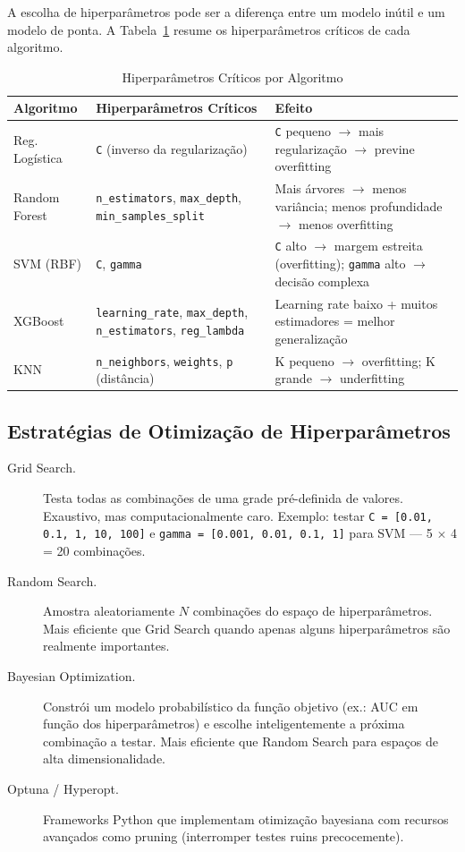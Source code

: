 A escolha de hiperparâmetros pode ser a diferença entre um modelo inútil e um modelo de ponta. A Tabela~\ref{tab:hiperparams} resume os hiperparâmetros críticos de cada algoritmo.

\begin{table}[H]
  \centering
  \caption{Hiperparâmetros Críticos por Algoritmo}
  \label{tab:hiperparams}
  \begin{tabularx}{\textwidth}{lXX}
    \toprule
    \textbf{Algoritmo} & \textbf{Hiperparâmetros Críticos} & \textbf{Efeito} \\
    \midrule
    Reg. Logística & \texttt{C} (inverso da regularização) & \texttt{C} pequeno $\rightarrow$ mais regularização $\rightarrow$ previne overfitting \\
    Random Forest & \texttt{n\_estimators}, \texttt{max\_depth}, \texttt{min\_samples\_split} & Mais árvores $\rightarrow$ menos variância; menos profundidade $\rightarrow$ menos overfitting \\
    SVM (RBF) & \texttt{C}, \texttt{gamma} & \texttt{C} alto $\rightarrow$ margem estreita (overfitting); \texttt{gamma} alto $\rightarrow$ decisão complexa \\
    XGBoost & \texttt{learning\_rate}, \texttt{max\_depth}, \texttt{n\_estimators}, \texttt{reg\_lambda} & Learning rate baixo + muitos estimadores = melhor generalização \\
    KNN & \texttt{n\_neighbors}, \texttt{weights}, \texttt{p} (distância) & K pequeno $\rightarrow$ overfitting; K grande $\rightarrow$ underfitting \\
    \bottomrule
  \end{tabularx}
\end{table}

\subsection{Estratégias de Otimização de Hiperparâmetros}

\begin{description}
    \item[Grid Search.] Testa todas as combinações de uma grade pré-definida de valores. Exaustivo, mas computacionalmente caro. Exemplo: testar \texttt{C = [0.01, 0.1, 1, 10, 100]} e \texttt{gamma = [0.001, 0.01, 0.1, 1]} para SVM — 5 $\times$ 4 = 20 combinações.
    \item[Random Search.] Amostra aleatoriamente $N$ combinações do espaço de hiperparâmetros. Mais eficiente que Grid Search quando apenas alguns hiperparâmetros são realmente importantes.
    \item[Bayesian Optimization.] Constrói um modelo probabilístico da função objetivo (ex.: AUC em função dos hiperparâmetros) e escolhe inteligentemente a próxima combinação a testar. Mais eficiente que Random Search para espaços de alta dimensionalidade.
    \item[Optuna / Hyperopt.] Frameworks Python que implementam otimização bayesiana com recursos avançados como pruning (interromper testes ruins precocemente).
\end{description}

